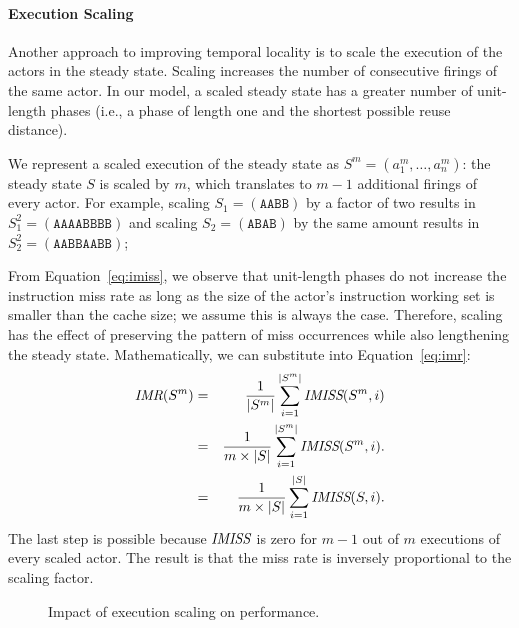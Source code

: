 \paragraph*{Execution Scaling}
Another approach to improving temporal locality is to scale the
execution of the actors in the steady state. Scaling increases the
number of consecutive firings of the same actor. In our model, a
scaled steady state has a greater number of unit-length phases (i.e., a
phase of length one and the shortest possible reuse distance).

We represent a scaled execution of the steady state as
$S^m=(a_1^m,\dots, a_n^m)$: the steady state $S$ is scaled by $m$, which
translates to $m-1$ additional firings of 
every actor. For example, scaling $S_1=(\texttt{AABB})$ by a factor of
two results in
$S_1^2=(\texttt{AAAABBBB})$
and scaling $S_2=(\texttt{ABAB})$ by the same amount results in 
$S_2^2=(\texttt{AABBAABB})$;

From Equation~\ref{eq:imiss}, we observe that unit-length phases do
not increase the instruction miss rate  as long as the size of the actor's 
instruction working set  is smaller than the cache
size; we assume this is always the case. Therefore, scaling has the
effect of preserving the pattern of 
miss occurrences while also lengthening the steady state. Mathematically,
we can substitute into Equation~\ref{eq:imr}:
\begin{eqnarray}
  \nonumber
  \mbox{\it IMR}(S^m)  &=& \frac{1}{|S^m|}\sum_{i=1}^{|S^m|} \mbox{\it IMISS}(S^m,i) \\
  \nonumber
                 &=& \frac{1}{m \times |S|}\sum_{i=1}^{|S^m|} \mbox{\it IMISS}(S^m,i). \\
  \label{eq:imrM}
                 &=& \frac{1}{m \times |S|}\sum_{i=1}^{|S|} \mbox{\it IMISS}(S,i).
\end{eqnarray}
The last step is possible because $\mbox{\it IMISS}$ is zero for $m-1$ out
of $m$ executions of every scaled actor.  The result is that the miss
rate is inversely proportional to the scaling factor.
\begin{figure}[t]
\begin{center}
  \caption{Impact of execution scaling on performance.}
 \label{fig:scaling-data}
\end{center}
\end{figure}

